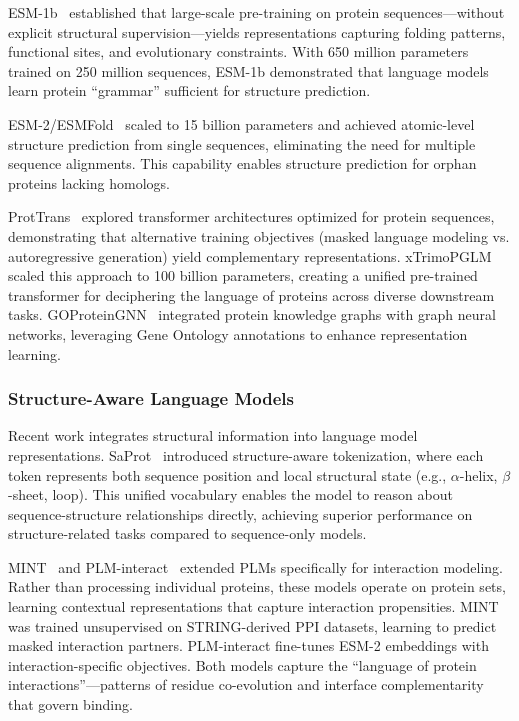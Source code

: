 ESM-1b~\cite{rives2021esm1b} established that large-scale pre-training on protein sequences---without explicit structural supervision---yields representations capturing folding patterns, functional sites, and evolutionary constraints. With 650 million parameters trained on 250 million sequences, ESM-1b demonstrated that language models learn protein ``grammar'' sufficient for structure prediction.

ESM-2/ESMFold~\cite{lin2023esm2} scaled to 15 billion parameters and achieved atomic-level structure prediction from single sequences, eliminating the need for multiple sequence alignments. This capability enables structure prediction for orphan proteins lacking homologs.

ProtTrans~\cite{elnaggar2021prottrans} explored transformer architectures optimized for protein sequences, demonstrating that alternative training objectives (masked language modeling vs. autoregressive generation) yield complementary representations. xTrimoPGLM~\cite{chen2024xtrimopglm} scaled this approach to 100 billion parameters, creating a unified pre-trained transformer for deciphering the language of proteins across diverse downstream tasks. GOProteinGNN~\cite{zhao2024goproteingnn} integrated protein knowledge graphs with graph neural networks, leveraging Gene Ontology annotations to enhance representation learning.

\subsubsection{Structure-Aware Language Models}

Recent work integrates structural information into language model representations. SaProt~\cite{su2024saprot} introduced structure-aware tokenization, where each token represents both sequence position and local structural state (e.g., $\alpha$-helix, $\beta$-sheet, loop). This unified vocabulary enables the model to reason about sequence-structure relationships directly, achieving superior performance on structure-related tasks compared to sequence-only models.

MINT~\cite{ullanat2025mint} and PLM-interact~\cite{zhao2025plminteract} extended PLMs specifically for interaction modeling. Rather than processing individual proteins, these models operate on protein sets, learning contextual representations that capture interaction propensities. MINT was trained unsupervised on STRING-derived PPI datasets, learning to predict masked interaction partners. PLM-interact fine-tunes ESM-2 embeddings with interaction-specific objectives. Both models capture the ``language of protein interactions''---patterns of residue co-evolution and interface complementarity that govern binding.


